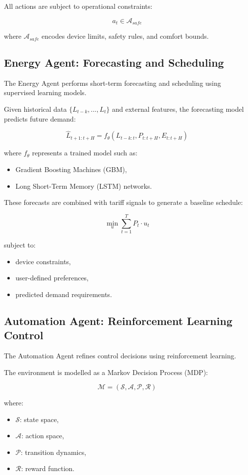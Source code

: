 \documentclass[11pt,a4paper]{article}
\begin{document}
All actions are subject to operational constraints:

$$
a_t \in \mathcal{A}_{safe}
$$

where $\mathcal{A}_{safe}$ encodes device limits, safety rules, and comfort bounds.

\subsection{Energy Agent: Forecasting and Scheduling}

The Energy Agent performs short-term forecasting and scheduling using supervised learning models.

Given historical data $\{L_{t-k}, ..., L_t\}$ and external features, the forecasting model predicts future demand:

$$
\hat{L}_{t+1:t+H} = f_{\theta}(L_{t-k:t}, P_{t:t+H}, E_{t:t+H})
$$

where $f_{\theta}$ represents a trained model such as:
\begin{itemize}
    \item Gradient Boosting Machines (GBM),
    \item Long Short-Term Memory (LSTM) networks.
\end{itemize}

These forecasts are combined with tariff signals to generate a baseline schedule:

$$
\min_{u} \sum_{t=1}^{T} P_t \cdot u_t
$$

subject to:
\begin{itemize}
    \item device constraints,
    \item user-defined preferences,
    \item predicted demand requirements.
\end{itemize}

\subsection{Automation Agent: Reinforcement Learning Control}

The Automation Agent refines control decisions using reinforcement learning.

The environment is modelled as a Markov Decision Process (MDP):

$$
\mathcal{M} = (\mathcal{S}, \mathcal{A}, \mathcal{P}, \mathcal{R})
$$

where:
\begin{itemize}
    \item $\mathcal{S}$: state space,
    \item $\mathcal{A}$: action space,
    \item $\mathcal{P}$: transition dynamics,
    \item $\mathcal{R}$: reward function.
\end{itemize}
\end{document}
